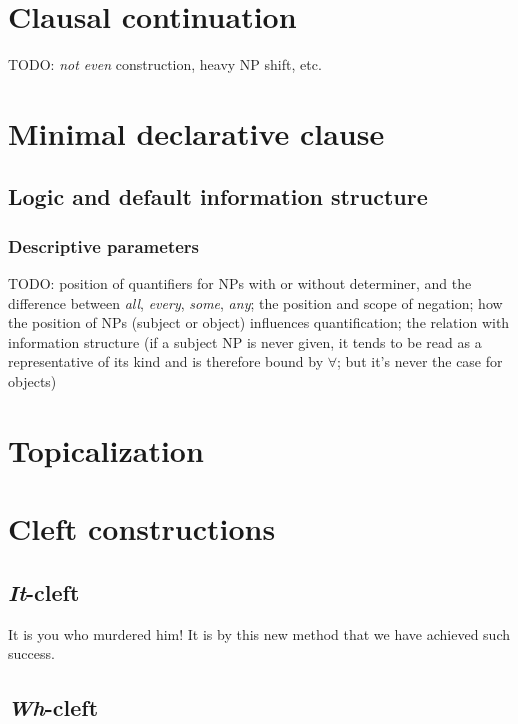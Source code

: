\documentclass[UTF8, a4paper, oneside, scheme=plain]{ctexrep}
\newcommand{\corpus}[1]{\emph{#1}}
\begin{document}
\section{Clausal continuation}

TODO: \corpus{not even} construction, heavy NP shift, etc.

\section{Minimal declarative clause}

\subsection{Logic and default information structure}

\subsubsection{Descriptive parameters}

TODO: position of quantifiers for NPs with or without determiner,
and the difference between \corpus{all}, \corpus{every}, \corpus{some}, \corpus{any};
the position and scope of negation;
how the position of NPs (subject or object) influences quantification;
the relation with information structure
(if a subject NP is never given, 
it tends to be read as a representative of its kind and is therefore bound by $\forall$;
but it's never the case for objects)

\section{Topicalization}\label{sec:simple-clause.information.topicalization}

\section{Cleft constructions}

\subsection{\corpus{It}-cleft}

\begin{exe}
    \ex It is you who murdered him!
    \ex It is by this new method that we have achieved such success.
\end{exe}

\subsection{\corpus{Wh}-cleft}
\end{document}
